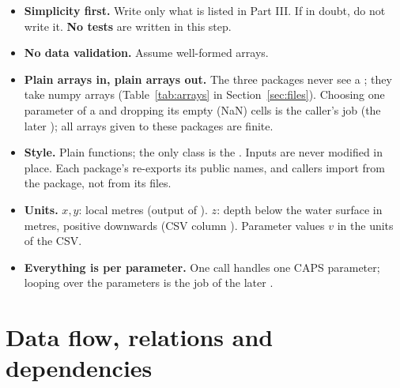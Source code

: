 \documentclass{article}
\begin{document}
\begin{itemize}
\item \textbf{Simplicity first.} Write only what is listed in Part III. If in doubt, do
      not write it. \textbf{No tests} are written in this step.
\item \textbf{No data validation.} Assume well-formed arrays.
\item \textbf{Plain arrays in, plain arrays out.} The three packages never see a
      ; they take numpy arrays (Table~\ref{tab:arrays} in Section~\ref{sec:files}). Choosing
      one parameter of a  and dropping its empty (NaN) cells is the
      caller's job (the later ); all arrays given to these packages
      are finite.
\item \textbf{Style.} Plain functions; the only class is the 
      . Inputs are never modified in place. Each package's
       re-exports its public names, and callers import from the
      package, not from its files.
\item \textbf{Units.} $x,y$: local metres (output of ). $z$: depth
      below the water surface in metres, positive downwards (CSV column
      ). Parameter values $v$ in the units of the CSV.
\item \textbf{Everything is per parameter.} One call handles one CAPS parameter;
      looping over the parameters is the job of the later .
\end{itemize}



\section{Data flow, relations and dependencies}
\end{document}

